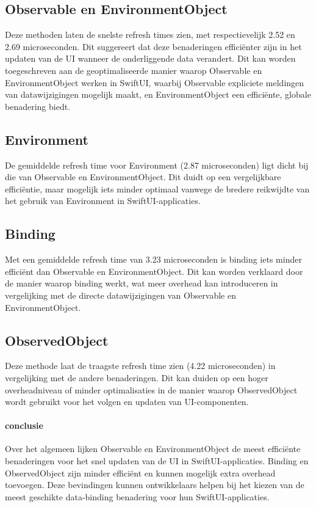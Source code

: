 \subsection{Observable en EnvironmentObject}
Deze methoden laten de snelste refresh times zien, met respectievelijk 2.52 en 2.69 microseconden. Dit suggereert dat deze benaderingen efficiënter zijn in het updaten van de UI wanneer de onderliggende data verandert. Dit kan worden toegeschreven aan de geoptimaliseerde manier waarop Observable en EnvironmentObject werken in SwiftUI, waarbij Observable expliciete meldingen van datawijzigingen mogelijk maakt, en EnvironmentObject een efficiënte, globale benadering biedt.

\subsection{Environment}
De gemiddelde refresh time voor Environment (2.87 microseconden) ligt dicht bij die van Observable en EnvironmentObject. Dit duidt op een vergelijkbare efficiëntie, maar mogelijk iets minder optimaal vanwege de bredere reikwijdte van het gebruik van Environment in SwiftUI-applicaties.

\subsection{Binding}
Met een gemiddelde refresh time van 3.23 microseconden is binding iets minder efficiënt dan Observable en EnvironmentObject. Dit kan worden verklaard door de manier waarop binding werkt, wat meer overhead kan introduceren in vergelijking met de directe datawijzigingen van Observable en EnvironmentObject.

\subsection{ObservedObject}
Deze methode laat de traagste refresh time zien (4.22 microseconden) in vergelijking met de andere benaderingen. Dit kan duiden op een hoger overheadniveau of minder optimalisaties in de manier waarop ObservedObject wordt gebruikt voor het volgen en updaten van UI-componenten.

\paragraph{conclusie}
Over het algemeen lijken Observable en EnvironmentObject de meest efficiënte benaderingen voor het snel updaten van de UI in SwiftUI-applicaties. Binding en ObservedObject zijn minder efficiënt en kunnen mogelijk extra overhead toevoegen. Deze bevindingen kunnen ontwikkelaars helpen bij het kiezen van de meest geschikte data-binding benadering voor hun SwiftUI-applicaties.

